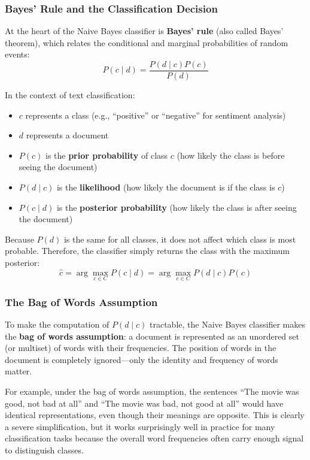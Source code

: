 \documentclass[11pt,a4paper]{article}
\begin{document}
\subsubsection{Bayes' Rule and the Classification Decision}

At the heart of the Naive Bayes classifier is \textbf{Bayes' rule} (also called Bayes' theorem), which relates the conditional and marginal probabilities of random events:
\[
P(c \mid d) = \frac{P(d \mid c) P(c)}{P(d)}
\]

In the context of text classification:
\begin{itemize}
    \item $c$ represents a class (e.g., ``positive'' or ``negative'' for sentiment analysis)
    \item $d$ represents a document
    \item $P(c)$ is the \textbf{prior probability} of class $c$ (how likely the class is before seeing the document)
    \item $P(d \mid c)$ is the \textbf{likelihood} (how likely the document is if the class is $c$)
    \item $P(c \mid d)$ is the \textbf{posterior probability} (how likely the class is after seeing the document)
\end{itemize}

Because $P(d)$ is the same for all classes, it does not affect which class is most probable. Therefore, the classifier simply returns the class with the maximum posterior:
\[
\hat{c} = \arg\max_{c \in C} P(c \mid d) = \arg\max_{c \in C} P(d \mid c) P(c)
\]

\subsubsection{The Bag of Words Assumption}

To make the computation of $P(d \mid c)$ tractable, the Naive Bayes classifier makes the \textbf{bag of words assumption}: a document is represented as an unordered set (or multiset) of words with their frequencies. The position of words in the document is completely ignored---only the identity and frequency of words matter.

For example, under the bag of words assumption, the sentences ``The movie was good, not bad at all'' and ``The movie was bad, not good at all'' would have identical representations, even though their meanings are opposite. This is clearly a severe simplification, but it works surprisingly well in practice for many classification tasks because the overall word frequencies often carry enough signal to distinguish classes.
\end{document}
